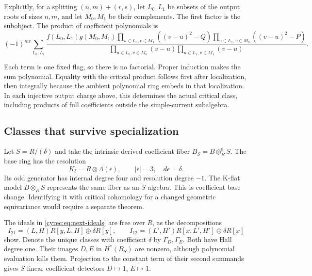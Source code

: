 Explicitly, for a splitting $(n,m)+(r,s)$, let $L_0,L_1$ be
subsets of the output roots of sizes $n,m$, and let $M_0,M_1$
be their complements. The first factor is the subobject.
The product of coefficient polynomials is
\begin{equation}\label{cyrec:eq:flag-formula}
 (-1)^{mr}\sum_{L_0,L_1}
 \frac{f(L_0,L_1)g(M_0,M_1)
  \displaystyle\prod_{u\in L_0,v\in M_1}((v-u)^2-Q)
  \displaystyle\prod_{u\in L_1,v\in M_0}((v-u)^2-P)}
 {\displaystyle\prod_{u\in L_0,v\in M_0}(v-u)
  \displaystyle\prod_{u\in L_1,v\in M_1}(v-u)}.
\end{equation}

Each term is one fixed flag, so there is no factorial.
Proper induction makes the sum polynomial. Equality with the
critical product follows first after localization, then integrally
because the ambient polynomial ring embeds in that localization.
In each injective output charge above, this determines the actual
critical class, including products of full coefficients outside
the simple-current subalgebra.

\subsection{Classes that survive specialization}

Let $S=R/(\delta)$ and take the intrinsic derived coefficient
fiber $B_S=B\otimes_R^{\mathbb L}S$. The base ring has the
resolution
\[
 K_\delta=R\otimes\Lambda(\epsilon),\qquad
 |\epsilon|=3,\quad d\epsilon=\delta.
\]
Its odd generator has internal degree four and resolution degree
$-1$. The K-flat model $B\otimes_RS$ represents the same fiber
as an $S$-algebra. This is coefficient base change. Identifying it
with critical cohomology for a changed geometric equivariance
would require a separate theorem.

The ideals in \eqref{cyrec:eq:next-ideals} are free over $R$,
as the decompositions
\begin{equation}\label{cyrec:eq:free-mixed}
 I_{21}=(L,H)R[y,L,H]\oplus\delta R[y],\qquad
 I_{12}=(L',H')R[x,L',H']\oplus\delta R[x]
\end{equation}
show. Denote the unique classes with coefficient $\delta$ by
$\Gamma_D,\Gamma_E$. Both have Hall degree one.
Their images $D,E$ in $H^*(B_S)$ are nonzero, although polynomial
evaluation kills them. Projection to the constant term of their
second summands gives $S$-linear coefficient detectors
$D\mapsto1$, $E\mapsto1$.

